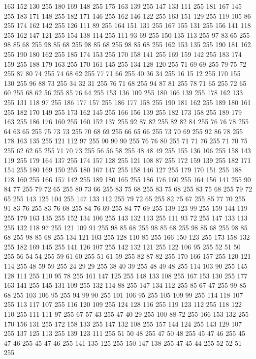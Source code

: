 163 152 130 255 180 169 148 255 175 163 139 255 147 133 111 255 181 167 145 255 183 171 148 255 182 171 146 255 162 146 122 255 163 151 129 255 119 105 86 255 174 162 142 255 126 111 89 255 164 151 131 255 167 155 131 255 156 141 118 255 162 147 121 255 154 138 114 255 111 93 69 255 150 135 113 255 97 83 65 255 98 85 68 255 98 85 68 255 98 85 68 255 98 85 68 255 162 153 135 255 190 181 162 255 190 180 162 255 185 174 153 255 170 158 141 255 169 159 142 255 183 174 159 255 188 179 163 255 170 161 145 255 134 128 120 255 71 69 69 255 79 75 72 255 87 80 74 255 74 68 62 255 77 71 66 255 40 36 34 255 16 15 12 255 170 155 130 255 96 88 73 255 34 32 31 255 76 71 68 255 94 87 81 255 78 71 65 255 72 65 60 255 68 62 56 255 85 76 64 255 153 136 109 255 180 166 139 255 178 162 133 255 131 118 97 255 186 177 157 255 186 177 158 255 190 181 162 255 189 180 161 255 182 170 149 255 173 162 145 255 166 156 139 255 182 173 158 255 189 179 163 255 186 176 160 255
160 152 137 255 92 87 82 255 82 82 84 255 76 76 78 255 64 63 65 255 75 73 73 255 70 68 69 255 66 65 66 255 73 70 69 255 92 86 78 255 178 163 135 255 121 112 97 255 90 90 90 255 76 76 80 255 71 71 76 255 71 70 75 255 62 62 65 255 71 70 73 255 56 56 58 255 48 48 49 255 155 136 106 255 158 143 119 255 179 164 137 255 174 157 128 255 121 108 87 255 172 159 139 255 182 171 154 255 180 169 150 255 180 167 147 255 158 146 127 255 179 170 151 255 188 178 160 255 166 157 142 255 189 180 165 255 186 176 160 255 164 156 141 255 90 84 77 255 79 72 65 255 80 73 66 255 83 75 68 255 83 75 68 255 83 75 68 255 79 72 65 255 143 125 104 255 147 133 112 255 79 72 65 255 82 75 67 255 85 77 70 255 91 83 76 255 83 76 68 255 84 76 69 255 84 77 69 255 139 123 99 255 159 144 119 255 179 163 135 255 152 134 106 255 143 132 113 255 111 93 72 255 147 133 113 255 132 118 97 255 121 109 91 255 98 85 68 255 98 85 68 255 98 85 68 255
98 85 68 255 98 85 68 255 134 121 103 255 128 110 85 255 166 150 123 255 173 158 132 255 182 169 145 255 141 126 107 255 142 132 121 255 122 106 95 255 52 51 50 255 56 54 54 255 59 61 60 255 51 61 59 255 82 87 82 255 170 166 157 255 120 121 114 255 48 59 59 255 24 29 29 255 38 40 39 255 48 49 48 255 114 103 90 255 145 128 111 255 110 95 78 255 161 147 125 255 148 133 108 255 167 153 130 255 177 163 141 255 145 131 109 255 132 114 88 255 147 134 112 255 85 67 47 255 99 85 68 255 103 106 95 255 94 99 90 255 101 106 95 255 105 109 99 255 114 118 107 255 113 117 107 255 116 120 109 255 124 128 116 255 119 123 112 255 118 122 110 255 111 111 97 255 67 57 43 255 47 40 29 255 100 88 72 255 166 153 132 255 170 156 131 255 172 158 133 255 147 132 108 255 157 144 124 255 143 129 107 255 137 125 113 255 139 123 111 255 51 50 48 255 47 50 48 255 45 47 46 255 45 47 46 255 45 47 46 255 141 135 125 255 150 147 138 255 47 45 44 255 52 52 51 255
